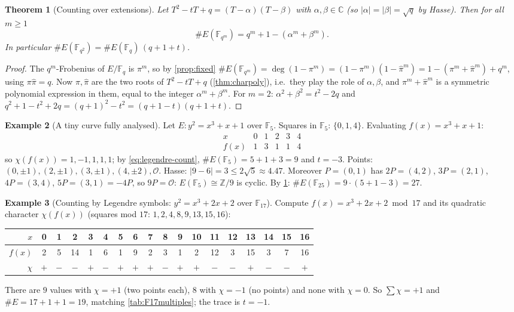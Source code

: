 \documentclass[11pt,a4paper,oneside]{book}
\theoremstyle{plain}
\newtheorem{theorem}{Theorem}[chapter]
\theoremstyle{definition}
\newtheorem{example}[theorem]{Example}
\theoremstyle{remark}
\newcommand{\Z}{\mathbb{Z}}
\newcommand{\C}{\mathbb{C}}
\newcommand{\F}{\mathbb{F}}
\newcommand{\Fq}{\mathbb{F}_q}
\newcommand{\Oinf}{\mathcal{O}}
\begin{document}
\begin{theorem}[Counting over extensions]\label{thm:extension-count}
Let $T^2-tT+q=(T-\alpha)(T-\beta)$ with $\alpha,\beta\in\C$ (so $|\alpha|=|\beta|=\sqrt q$ by Hasse). Then for all $m\ge1$
\[
\#E(\F_{q^m})=q^m+1-(\alpha^m+\beta^m).
\]
In particular $\#E(\F_{q^2})=\#E(\Fq)\,(q+1+t)$.
\end{theorem}
\begin{proof}
The $q^m$-Frobenius of $E/\F_{q}$ is $\pi^m$, so by \cref{prop:fixed} $\#E(\F_{q^m})=\deg(1-\pi^m)=(1-\pi^m)(1-\hat\pi^m)=1-(\pi^m+\hat\pi^m)+q^m$, using $\pi\hat\pi=q$. Now $\pi,\hat\pi$ are the two roots of $T^2-tT+q$ (\cref{thm:charpoly}), i.e.\ they play the role of $\alpha,\beta$, and $\pi^m+\hat\pi^m$ is a symmetric polynomial expression in them, equal to the integer $\alpha^m+\beta^m$. For $m=2$: $\alpha^2+\beta^2=t^2-2q$ and $q^2+1-t^2+2q=(q+1)^2-t^2=(q+1-t)(q+1+t)$.
\end{proof}

\begin{example}[A tiny curve fully analysed]\label{ex:F5}
Let $E:y^2=x^3+x+1$ over $\F_5$. Squares in $\F_5$: $\{0,1,4\}$. Evaluating $f(x)=x^3+x+1$:
\[
\begin{array}{c|ccccc}x&0&1&2&3&4\\\hline f(x)&1&3&1&1&4\end{array}
\]
so $\chi(f(x))=1,-1,1,1,1$; by \eqref{eq:legendre-count}, $\#E(\F_5)=5+1+3=9$ and $t=-3$. Points: $(0,\pm1),(2,\pm1),(3,\pm1),(4,\pm2),\Oinf$. Hasse: $|9-6|=3\le2\sqrt5\approx4.47$. \checkmark
Moreover $P=(0,1)$ has $2P=(4,2)$, $3P=(2,1)$, $4P=(3,4)$, $5P=(3,1)=-4P$, so $9P=\Oinf$: $E(\F_5)\cong\Z/9$ is cyclic.
By \cref{thm:extension-count}: $\#E(\F_{25})=9\cdot(5+1-3)=27$.
\end{example}

\begin{example}[Counting by Legendre symbols: $y^2=x^3+2x+2$ over $\F_{17}$]\label{ex:F17count}
Compute $f(x)=x^3+2x+2\bmod17$ and its quadratic character $\chi(f(x))$ (squares mod $17$: $1,2,4,8,9,13,15,16$):
\begin{center}
\scriptsize\setlength{\tabcolsep}{2.4pt}
\begin{tabular}{r|*{17}{c}}
$x$ & 0&1&2&3&4&5&6&7&8&9&10&11&12&13&14&15&16\\\hline
$f(x)$ & 2&5&14&1&6&1&9&2&3&1&2&12&3&15&3&7&16\\
$\chi$ & $+$&$-$&$-$&$+$&$-$&$+$&$+$&$+$&$-$&$+$&$+$&$-$&$-$&$+$&$-$&$-$&$+$
\end{tabular}
\end{center}
There are $9$ values with $\chi=+1$ (two points each), $8$ with $\chi=-1$ (no points) and none with $\chi=0$. So $\sum\chi=+1$ and $\#E=17+1+1=19$, matching \cref{tab:F17multiples}; the trace is $t=-1$.
\end{example}
\end{document}
